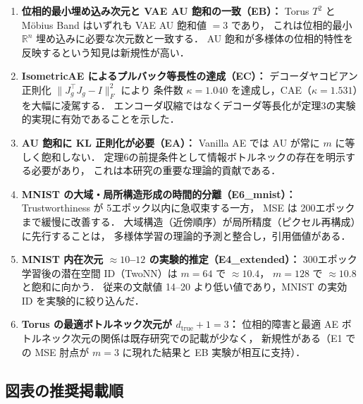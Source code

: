 \documentclass[12pt,a4paper]{ltjsarticle}  %
\newcommand{\dtrue}{d_{\mathrm{true}}}
\begin{document}
\begin{enumerate}
  \item \textbf{位相的最小埋め込み次元と VAE AU 飽和の一致（EB）：}
    Torus $T^2$ と Möbius Band はいずれも VAE AU 飽和値 $= 3$ であり，
    これは位相的最小 $\mathbb{R}^n$ 埋め込みに必要な次元数と一致する．
    AU 飽和が多様体の位相的特性を反映するという知見は新規性が高い．
  \item \textbf{IsometricAE によるプルバック等長性の達成（EC）：}
    デコーダヤコビアン正則化 $\|J_g^\top J_g - I\|_F^2$ により
    条件数 $\kappa=1.040$ を達成し，CAE（$\kappa=1.531$）を大幅に凌駕する．
    エンコーダ収縮ではなくデコーダ等長化が定理3の実験的実現に有効であることを示した．
  \item \textbf{AU 飽和に KL 正則化が必要（EA）：}
    Vanilla AE では AU が常に $m$ に等しく飽和しない．
    定理6の前提条件として情報ボトルネックの存在を明示する必要があり，
    これは本研究の重要な理論的貢献である．
  \item \textbf{MNIST の大域・局所構造形成の時間的分離（E6\_mnist）：}
    Trustworthiness が 5エポック以内に急収束する一方，
    MSE は 200エポックまで緩慢に改善する．
    大域構造（近傍順序）が局所精度（ピクセル再構成）に先行することは，
    多様体学習の理論的予測と整合し，引用価値がある．
  \item \textbf{MNIST 内在次元 $\approx 10$--$12$ の実験的推定（E4\_extended）：}
    300エポック学習後の潜在空間 ID（TwoNN）は $m=64$ で $\approx 10.4$，
    $m=128$ で $\approx 10.8$ と飽和に向かう．
    従来の文献値 14--20 より低い値であり，MNIST の実効 ID を実験的に絞り込んだ．
  \item \textbf{Torus の最適ボトルネック次元が $\dtrue + 1 = 3$：}
    位相的障害と最適 AE ボトルネック次元の関係は既存研究での記載が少なく，
    新規性がある（E1 での MSE 肘点が $m=3$ に現れた結果と EB 実験が相互に支持）．
\end{enumerate}

\subsection{図表の推奨掲載順}
\end{document}
